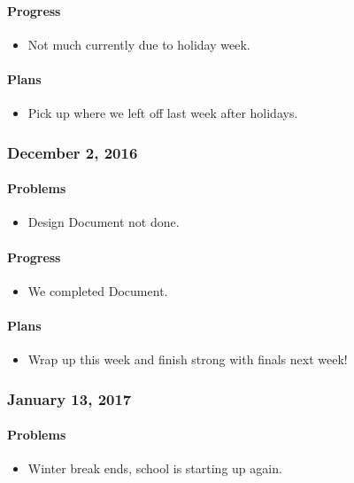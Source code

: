 \paragraph{Progress}\label{progress}
\begin{itemize}
\tightlist
\item
  Not much currently due to holiday week.
\end{itemize}
\paragraph{Plans}\label{plans}
\begin{itemize}
\tightlist
\item
  Pick up where we left off last week after holidays.
\end{itemize}

\subsubsection{December 2, 2016}\label{section}
\paragraph{Problems}\label{problems}
\begin{itemize}
\tightlist
\item
  Design Document not done.
\end{itemize}
\paragraph{Progress}\label{progress}
\begin{itemize}
\tightlist
\item
  We completed Document.
\end{itemize}
\paragraph{Plans}\label{plans}
\begin{itemize}
\tightlist
\item
  Wrap up this week and finish strong with finals next week!
\end{itemize}

\subsubsection{January 13, 2017}\label{section}
\paragraph{Problems}\label{problems}
\begin{itemize}
\tightlist
\item
  Winter break ends, school is starting up again.
\end{itemize}
